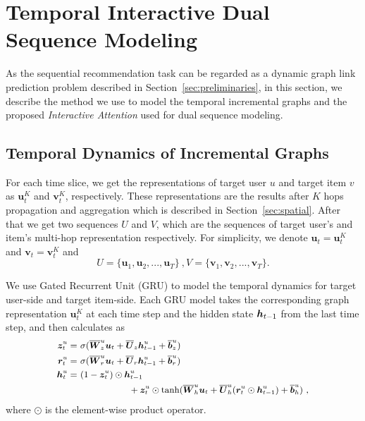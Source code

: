 \section{Temporal Interactive Dual Sequence Modeling} \label{sec:temporal}
As the sequential recommendation task can be regarded as a dynamic graph link prediction problem described in Section~\ref{sec:preliminaries}, in this section, we describe the method we use to model the temporal incremental graphs and the proposed \textit{Interactive Attention} used for dual sequence modeling.

\subsection{Temporal Dynamics of Incremental Graphs}
For each time slice, we get the representations of target user $u$ and target item $v$ as $\bm u_t^K$ and $\bm v_t^K$, respectively. These representations are the results after $K$ hops propagation and aggregation which is described in Section~\ref{sec:spatial}.
After that we get two sequences $U$ and $V$, which are the sequences of target user's and item's multi-hop representation respectively. For simplicity, we denote $\bm u_t = \bm u_t^K$ and $\bm v_t = \bm v_t^K$ and
\begin{equation}
U = \{\bm{u}_1, \bm{u}_2, ..., \bm{u}_{T}\}~,
V = \{\bm{v}_1, \bm{v}_2, ..., \bm{v}_{T}\} .
\end{equation}

We use Gated Recurrent Unit \cite{cho2014learning} (GRU) to model the temporal dynamics for  target user-side and target item-side. Each GRU model takes the corresponding graph representation $\bm u_t^K$ at each time step and the hidden state $\boldsymbol{h}_{t-1}$ from the last time step, and then calculates as
\begin{equation}\small
\begin{aligned}
\bm{z}_t^u =& ~\sigma (\overline{\bm{W}}_z^u \bm{u}_t + \overline{\bm{U}}_z \boldsymbol{h}_{t-1}^u + \overline{\bm{b}}_z^u) \\
\bm{r}_t^u =& ~\sigma (\overline{\bm{W}}_r^u \bm{u}_t + \overline{\bm{U}}_r \boldsymbol{h}_{t-1}^u + \overline{\bm{b}}_r^u) \\
\boldsymbol{h}_{t}^u =& ~(1 - \bm{z}_t^u) \odot \boldsymbol{h}_{t-1}^u  \\
&~~~~~~~~~~~~~~~~~+ \bm{z}_t^u \odot \tanh(\overline{\bm{W}}_h^u \bm{u}_t + \overline{\bm{U}}_h^u (\bm{r}_t^u \odot \boldsymbol{h}_{t-1}^u) + \overline{\bm{b}}_h^u)  ~,
\end{aligned}
\label{eq:gru}
\end{equation}
where $\odot$ is the element-wise product operator. 

